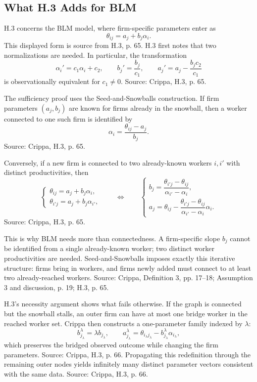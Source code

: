 \documentclass[11pt]{article}
\begin{document}
\subsection{What H.3 Adds for BLM}

H.3 concerns the BLM model, where firm-specific parameters enter as
\[
\theta_{ij}=a_j+b_j\alpha_i.
\]
This displayed form is source from H.3, p. 65. H.3 first notes that two
normalizations are needed. In particular, the transformation
\[
\alpha_i'=c_1\alpha_i+c_2,
\qquad
b_j'=\frac{b_j}{c_1},
\qquad
a_j'=a_j-\frac{b_jc_2}{c_1}
\]
is observationally equivalent for $c_1\neq0$. Source: Crippa, H.3, p. 65.

The sufficiency proof uses the Seed-and-Snowballs construction. If firm
parameters $(a_j,b_j)$ are known for firms already in the snowball, then a
worker connected to one such firm is identified by
\[
\alpha_i=\frac{\theta_{ij}-a_j}{b_j}.
\]
Source: Crippa, H.3, p. 65.

Conversely, if a new firm is connected to two already-known workers $i,i'$ with
distinct productivities, then
\[
\begin{cases}
\theta_{ij}=a_j+b_j\alpha_i,\\
\theta_{i'j}=a_j+b_j\alpha_{i'},
\end{cases}
\qquad\Longleftrightarrow\qquad
\begin{cases}
b_j=\dfrac{\theta_{i'j}-\theta_{ij}}{\alpha_{i'}-\alpha_i},\\[1.0em]
a_j=\theta_{ij}-\dfrac{\theta_{i'j}-\theta_{ij}}{\alpha_{i'}-\alpha_i}\alpha_i.
\end{cases}
\]
Source: Crippa, H.3, p. 65.

This is why BLM needs more than connectedness. A firm-specific slope $b_j$ cannot
be identified from a single already-known worker; two distinct worker
productivities are needed. Seed-and-Snowballs imposes exactly this iterative
structure: firms bring in workers, and firms newly added must connect to at
least two already-reached workers. Source: Crippa, Definition 3, pp. 17--18;
Assumption 3 and discussion, p. 19; H.3, p. 65.

H.3's necessity argument shows what fails otherwise. If the graph is connected
but the snowball stalls, an outer firm can have at most one bridge worker in the
reached worker set. Crippa then constructs a one-parameter family indexed by
$\lambda$:
\[
b_{j_\lambda}^{\lambda}=\lambda b_{j_\lambda},
\qquad
a_{j_\lambda}^{\lambda}
=\theta_{i_\lambda j_\lambda}
-b_{j_\lambda}^{\lambda}\alpha_{i_\lambda},
\]
which preserves the bridged observed outcome while changing the firm
parameters. Source: Crippa, H.3, p. 66. Propagating this redefinition through the
remaining outer nodes yields infinitely many distinct parameter vectors
consistent with the same data. Source: Crippa, H.3, p. 66.
\end{document}
